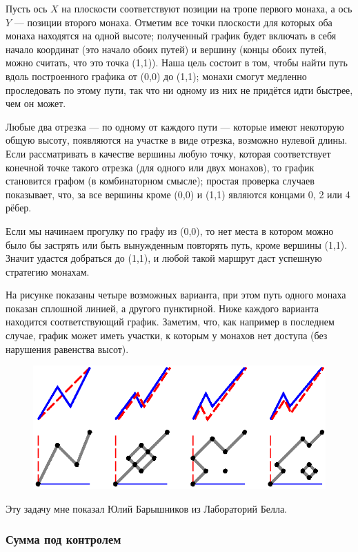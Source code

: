 Пусть ось $X$ на плоскости соответствуют позиции на тропе первого монаха, а ось $Y$ --- позиции второго монаха.
Отметим все точки плоскости для которых оба монаха находятся на одной высоте;
полученный график будет включать в себя начало координат (это начало обоих путей) и вершину (концы обоих путей, можно считать, что это точка (1,1)).
Наша цель состоит в том, чтобы найти путь вдоль построенного графика от (0,0) до (1,1);
монахи смогут медленно проследовать по этому пути, так что ни одному из них не придётся идти быстрее, чем он может.

Любые два отрезка --- по одному от каждого пути --- которые имеют некоторую общую высоту, появляются на участке в виде отрезка, возможно нулевой длины.
Если рассматривать в качестве вершины любую точку, которая соответствует конечной точке такого отрезка (для одного или двух монахов), то график становится графом (в комбинаторном смысле);
простая проверка случаев показывает, что, за все вершины кроме (0,0) и (1,1) являются концами 0, 2 или 4 рёбер.

Если мы начинаем прогулку по графу из (0,0), то нет места в котором можно было бы застрять или быть вынужденным повторять путь, кроме вершины (1,1).
Значит удастся добраться до (1,1), и любой такой маршрут даст успешную стратегию монахам.
\heart

На рисунке показаны четыре возможных варианта, при этом путь одного монаха показан сплошной линией, а другого пунктирной.
Ниже каждого варианта находится соответствующий график.
Заметим, что, как например в последнем случае, график может иметь участки, к которым у монахов нет доступа (без нарушения равенства высот).

\begin{figure}[h!]
\centering
\includegraphics[scale=0.9]{Figs/Toughies/monks}
\end{figure} 

Эту задачу мне показал Юлий Барышников из Лабораторий Белла.

\subsubsection*{Сумма под контролем}

